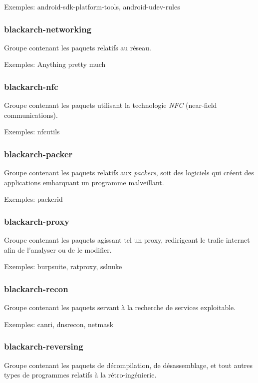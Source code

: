 \documentclass[a4paper, oneside, 11pt]{book}
\begin{document}
Exemples: android-sdk-platform-tools, android-udev-rules

\subsubsection{blackarch-networking}

Groupe contenant les paquets relatifs au r\'{e}seau.

Exemples: Anything pretty much

\subsubsection{blackarch-nfc}

Groupe contenant les paquets utilisant la technologie \textit{NFC} (near-field
communications).

Exemples: nfcutils

\subsubsection{blackarch-packer}

Groupe contenant les paquets relatifs aux \textit{packers}, soit des logiciels qui cr\'{e}ent des applications embarquant un programme malveillant.

Exemples: packerid

\subsubsection{blackarch-proxy}

Groupe contenant les paquets agissant tel un proxy, redirigeant le trafic internet afin de l'analyser ou de le modifier.

Exemples: burpsuite, ratproxy, sslnuke

\subsubsection{blackarch-recon}

Groupe contenant les paquets servant \`{a} la recherche de services exploitable.

Exemples: canri, dnsrecon, netmask

\subsubsection{blackarch-reversing}

Groupe contenant les paquets de d\'{e}compilation, de d\'{e}sassemblage, et tout autres types de programmes relatifs \`{a} la r\'{e}tro-ing\'{e}nierie.
\end{document}
